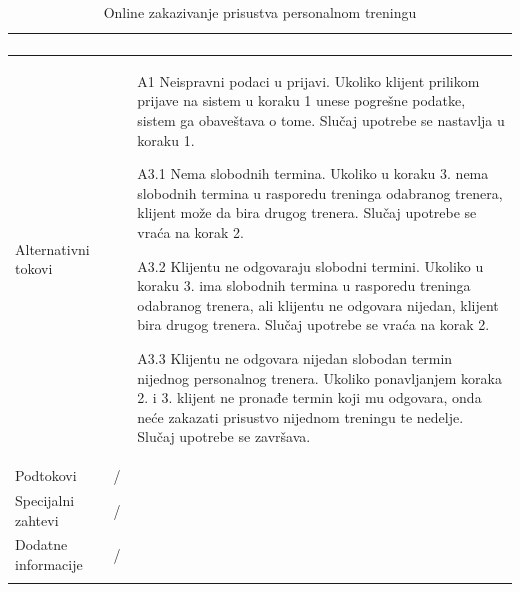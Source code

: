 \begin{longtable}{| p{} | p{} |}
\begin{enumerate}
   \end{enumerate} \\
\hline
    Alternativni tokovi & 
    \begin{itemize}
    \item[A1] Neispravni podaci u prijavi. Ukoliko klijent prilikom prijave na sistem u koraku 1 unese pogrešne podatke, sistem ga obaveštava o tome. Slučaj upotrebe se nastavlja u koraku 1.
    \item[A3.1] Nema slobodnih termina. Ukoliko u koraku 3. nema slobodnih termina u rasporedu treninga odabranog trenera, klijent može da bira drugog trenera. Slučaj upotrebe se vraća na korak 2.
    \item[A3.2] Klijentu ne odgovaraju slobodni termini. Ukoliko u koraku 3. ima slobodnih termina u rasporedu treninga odabranog trenera, ali klijentu ne odgovara nijedan, klijent bira drugog trenera. Slučaj upotrebe se vraća na korak 2.
    \item[A3.3] Klijentu ne odgovara nijedan slobodan termin nijednog personalnog trenera. Ukoliko ponavljanjem koraka 2. i 3. klijent ne pronađe termin koji mu odgovara, onda neće zakazati prisustvo nijednom treningu te nedelje. Slučaj upotrebe se završava.
   \end{itemize} \\
\hline
    Podtokovi & /\\
\hline
    Specijalni zahtevi & /\\
\hline
    Dodatne informacije & / \\
\hline
\caption{ Online zakazivanje prisustva personalnom treningu}
\end{longtable}



